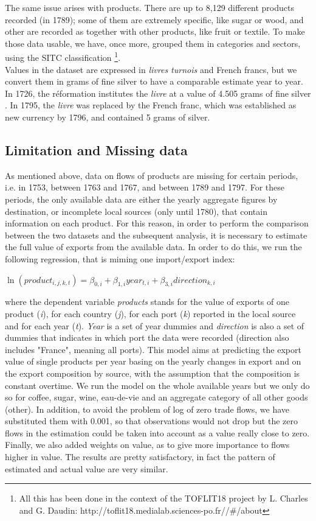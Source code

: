 \documentclass[12pt,a4paper,notitlepage,english]{article}
\begin{document}
The same issue arises with products.
There are up to 8,129 different  products recorded (in 1789); some of them are extremely specific, like sugar or wood, and other are recorded as together with other products, like fruit or textile.
To make those data usable, we have, once more, grouped them in categories and sectors, using the SITC classification \footnote{All this has been done in the context of the TOFLIT18 project by  L. Charles and G. Daudin: http://toflit18.medialab.sciences-po.fr//\#/about}.  \\
Values in the dataset are expressed in \textit{livres turnois} and French francs, but we convert them in grams of fine silver to have a comparable estimate year to year.
In 1726, the réformation institutes the \textit{livre} at a value of 4.505 grams of fine silver \citep{de_wailly_memoire_1857}.
In 1795, the \textit{livre} was replaced by the French franc, which was established as new currency by 1796, and contained 5 grams of silver.

\subsection{Limitation and Missing data} \label{limitations}
As mentioned above, data on flows of products are missing for certain periods, i.e. in 1753, between 1763 and 1767, and between 1789 and 1797.
For these periods, the only available data are either the yearly aggregate figures by destination, or incomplete local sources (only until 1780), that contain information on each product.
For this reason, in order to perform the comparison between the two datasets and the subsequent analysis, it is necessary to estimate the full value of exports from the available data.
In order to do this, we run the following regression, that is miming one import/export index:
\begin{center}
$\ln(product_{i,j,k,t})=\beta_{0,i} + \beta_{1,i}year_{t,i}+\beta_{3,i}direction_{k,i}$
\end{center}
where the dependent variable \textit{products} stands for the value of exports of one product (\textit{i}), for each country (\textit{j}), for each port (\textit{k}) reported in the local source and for each year (\textit{t}).
\textit{Year} is a set of year dummies and \textit{direction} is also a set of dummies that indicates in which port the data were recorded (direction also includes "France", meaning all ports).
This model aims at predicting the export value of single products per year basing on the yearly changes in export and on the export composition by source, with the assumption that the composition is constant overtime.
We run the model on the whole available years but we only do so for coffee, sugar, wine, eau-de-vie and an aggregate category of all other goods (other).
In addition, to avoid the problem of log of zero trade flows, we have substituted them with 0.001, so that observations would not drop but the zero flows in the estimation could be taken into account as a value really close to zero.
Finally, we also added weights on value, as to give more importance to flows higher in value.
The results are pretty satisfactory, in fact the pattern of estimated and actual value are very similar.
\end{document}
